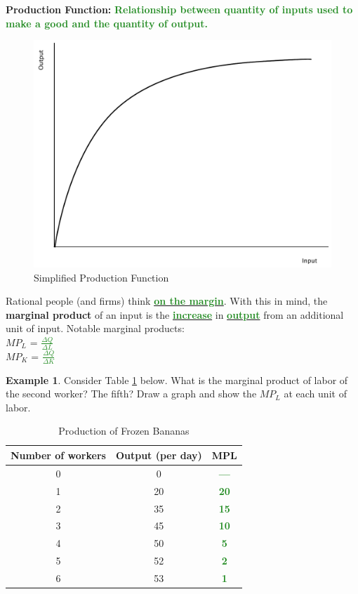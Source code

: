\documentclass[11pt]{article}\usepackage[]{graphicx}\usepackage[]{color}
\theoremstyle{definition}
\newtheorem{exmp}{Example}[section]
\newcommand{\ddp}[1]{{\textbf{\textcolor{ForestGreen}{#1}}}}
\newcommand{\dd}[1]{{\underline{\textbf{\textcolor{ForestGreen}{#1}}}}}
\newcommand{\defn}[1]{\textbf{#1}}
\begin{document}
	\defn{Production Function:} \ddp{Relationship between quantity of inputs used to make a good and the quantity of output.}
	\\
	
	\begin{figure}[H]
			\centering
			\includegraphics[scale=.30]{plot54.pdf}
			\caption{Simplified Production Function}
		\end{figure}
	
	Rational people (and firms) think \dd{on the margin}. With this in mind, the \defn{marginal product} of an input is the \dd{increase} in \dd{output} from an additional unit of input. Notable marginal products:
	\\
	
	$MP_L$ = \ddp{$\frac{\Delta Q}{\Delta L}$}  
	\\
	
	$MP_K$ = \ddp{$\frac{\Delta Q}{\Delta K}$}  
	\\
	
	\begin{exmp}
		
		Consider Table \ref{bluth} below. What is the marginal product of labor of the second worker? The fifth? Draw a graph and show the $MP_L$ at each unit of labor.
	
	\begin{table}[ht]
		\centering
		\caption{Production of Frozen Bananas}
		\label{bluth}
		\begin{tabular}{ c|c|c}        
			
			Number of workers & Output (per day) & MPL \\
			\hline
			0 & 0 & \ddp{---} \\
			1 & 20 & \ddp{20} \\
			2 & 35 & \ddp{15} \\
			3 & 45 & \ddp{10} \\
			4 & 50 & \ddp{5} \\
			5 & 52 & \ddp{2} \\
			6 & 53 & \ddp{1} \\
		\end{tabular}
	\end{table} 
	\end{exmp}
	
\end{document}
